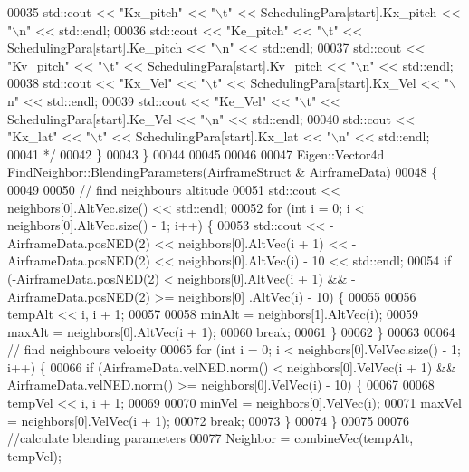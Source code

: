 \begin{DoxyCode}
00035 \textcolor{comment}{        std::cout << "Kx\_pitch" << "\(\backslash\)t" << SchedulingPara[start].Kx\_pitch << "\(\backslash\)n" << std::endl;}
00036 \textcolor{comment}{        std::cout << "Ke\_pitch" << "\(\backslash\)t" << SchedulingPara[start].Ke\_pitch << "\(\backslash\)n" << std::endl;}
00037 \textcolor{comment}{        std::cout << "Kv\_pitch" << "\(\backslash\)t" << SchedulingPara[start].Kv\_pitch << "\(\backslash\)n" << std::endl;}
00038 \textcolor{comment}{        std::cout << "Kx\_Vel" << "\(\backslash\)t" << SchedulingPara[start].Kx\_Vel << "\(\backslash\)n" << std::endl;}
00039 \textcolor{comment}{        std::cout << "Ke\_Vel" << "\(\backslash\)t" << SchedulingPara[start].Ke\_Vel << "\(\backslash\)n" << std::endl;}
00040 \textcolor{comment}{        std::cout << "Kx\_lat" << "\(\backslash\)t" << SchedulingPara[start].Kx\_lat << "\(\backslash\)n" << std::endl;}
00041 \textcolor{comment}{        */}
00042     \}
00043 \}
00044 
00045 
00046 
00047 Eigen::Vector4d FindNeighbor::BlendingParameters(AirframeStruct & AirframeData)
00048 \{
00049     
00050     \textcolor{comment}{// find neighbours altitude}
00051     std::cout << neighbors[0].AltVec.size() << std::endl;
00052     \textcolor{keywordflow}{for} (\textcolor{keywordtype}{int} i = 0; i < neighbors[0].AltVec.size() - 1; i++) \{
00053         std::cout << -AirframeData.posNED(2) << neighbors[0].AltVec(i + 1) << -AirframeData.posNED(2) << 
      neighbors[0].AltVec(i) - 10 <<  std::endl;
00054         \textcolor{keywordflow}{if} (-AirframeData.posNED(2) < neighbors[0].AltVec(i + 1) && -AirframeData.posNED(2) >= neighbors[0]
      .AltVec(i) - 10) \{
00055 
00056             tempAlt << i, i + 1;
00057 
00058             minAlt = neighbors[1].AltVec(i);
00059             maxAlt = neighbors[0].AltVec(i + 1);
00060             \textcolor{keywordflow}{break};
00061         \}
00062     \}
00063 
00064     \textcolor{comment}{// find neighbours velocity}
00065     \textcolor{keywordflow}{for} (\textcolor{keywordtype}{int} i = 0; i < neighbors[0].VelVec.size() - 1; i++) \{
00066         \textcolor{keywordflow}{if} (AirframeData.velNED.norm() < neighbors[0].VelVec(i + 1) && AirframeData.velNED.norm() >= 
      neighbors[0].VelVec(i) - 10) \{
00067             
00068             tempVel << i, i + 1;
00069 
00070             minVel = neighbors[0].VelVec(i);
00071             maxVel = neighbors[0].VelVec(i + 1);
00072             \textcolor{keywordflow}{break};
00073         \}
00074     \}
00075 
00076     \textcolor{comment}{//calculate blending parameters}
00077     Neighbor = combineVec(tempAlt, tempVel);

\end{DoxyCode}
